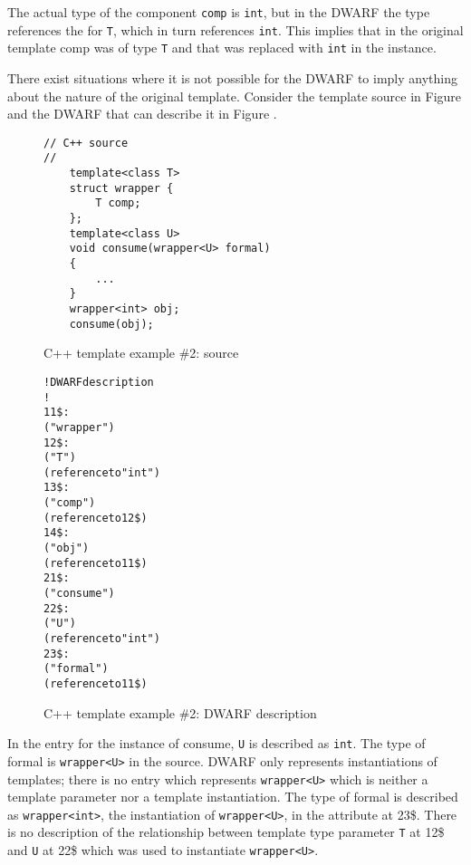 The actual type of the component \texttt{comp} is \texttt{int}, but in the DWARF
the type references the
\DWTAGtemplatetypeparameter{}
for \texttt{T}, which in turn references \texttt{int}. This implies that in the
original template comp was of type \texttt{T} and that was replaced
with \texttt{int} in the instance. 

There exist situations where it is
not possible for the DWARF to imply anything about the nature
of the original template. 
Consider the  template source in
Figure 
and the DWARF that can describe it in
Figure .

\begin{figure}[!ht]
\begin{lstlisting}
// C++ source
//
    template<class T>
    struct wrapper {
        T comp;
    };
    template<class U>
    void consume(wrapper<U> formal)
    {
        ...
    }
    wrapper<int> obj;
    consume(obj);
\end{lstlisting}
\caption{C++ template example \#2: source}
\label{fig:ctemplateexample2source}
\end{figure}

\begin{figure}[ht]
\begin{dwflisting}
\begin{alltt}
! DWARF description
!
11\$:  \DWTAGstructuretype
          \DWATname("wrapper")
12\$:      \DWTAGtemplatetypeparameter
              \DWATname("T")
              \DWATtype(reference to "int")
13\$:      \DWTAGmember
              \DWATname("comp")
              \DWATtype(reference to 12\$)
14\$:  \DWTAGvariable
          \DWATname("obj")
          \DWATtype(reference to 11\$)
21\$:  \DWTAGsubprogram
          \DWATname("consume")
22\$:      \DWTAGtemplatetypeparameter
              \DWATname("U")
              \DWATtype(reference to "int")
23\$:      \DWTAGformalparameter
              \DWATname("formal")
              \DWATtype(reference to 11\$)
\end{alltt}
\end{dwflisting}
\caption{C++ template example \#2: DWARF description}
\label{fig:ctemplateexample2dwarf}
\end{figure}

In the \DWTAGsubprogram{} 
entry for the instance of consume, \texttt{U} is described as \texttt{int}. 
The type of formal is \texttt{wrapper\textless U\textgreater} in
the source. DWARF only represents instantiations of templates;
there is no entry which represents \texttt{wrapper\textless U\textgreater} 
which is neither
a template parameter nor a template instantiation. The type
of formal is described as \texttt{wrapper\textless int\textgreater},
the instantiation of \texttt{wrapper\textless U\textgreater},
in the \DWATtype{} attribute at 
23\$. 
There is no
description of the relationship between template type parameter
\texttt{T} at 12\$ and \texttt{U} at 22\$ which was used to instantiate
\texttt{wrapper\textless U\textgreater}.

